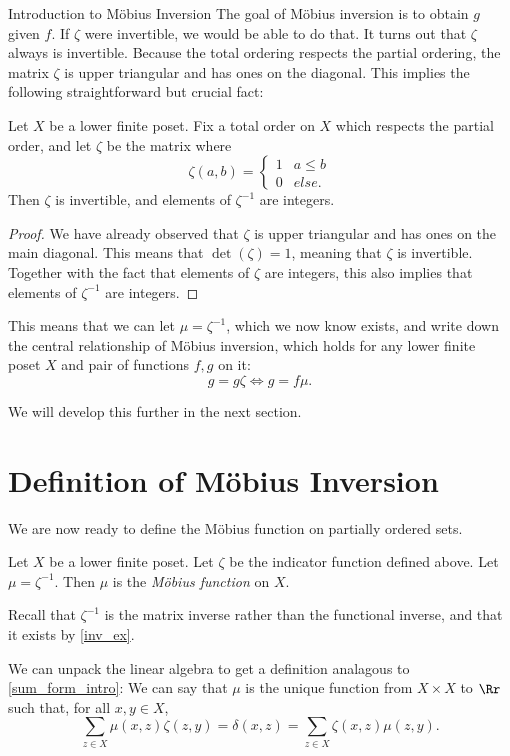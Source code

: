 \documentclass[12pt]{pom_thesis}
\begin{document}
\begin{chapter}{Introduction to M\"obius Inversion}
The goal of M\"obius inversion is to obtain $g$ given $f$. If $\zeta$ were invertible, we would be able to do that. It turns out that $\zeta$ always is invertible. Because the total ordering respects the partial ordering, the matrix $\zeta$ is upper triangular and has ones on the diagonal. This implies the following straightforward but crucial fact:
\begin{lemma}\label{inv_ex}
Let $X$ be a lower finite poset. Fix a total order on $X$ which respects the partial order, and let $\zeta$ be the matrix where 
\[
\zeta(a,b) = \begin{cases}1 & a \leq b \\ 0 & else. \end{cases}
\]
Then $\zeta$ is invertible, and elements of $\zeta^{-1}$ are integers.
\end{lemma}
\begin{proof}
We have already observed that $\zeta$ is upper triangular and has ones on the main diagonal. This means that $\det(\zeta) = 1$, meaning that $\zeta$ is invertible. Together with the fact that elements of $\zeta$ are integers, this also implies that elements of $\zeta^{-1}$ are integers.
\end{proof}

This means that we can let $\mu=\zeta^{-1}$, which we now know exists, and write down the central relationship of M\"obius inversion, which holds for any lower finite poset $X$ and pair of functions $f,g$ on it:
\[
g = g \zeta \iff g = f \mu.
\]

We will develop this further in the next section.

\section{Definition of M\"obius Inversion}
We are now ready to define the M\"obius function on partially ordered sets.
\begin{defn}\label{def_mob_pos}
Let $X$ be a lower finite poset. Let $\zeta$ be the indicator function defined above. Let $\mu = \zeta^{-1}$. Then $\mu$ is the \emph{M\"obius function} on $X$.
\end{defn}
\begin{rmk}
Recall that $\zeta^{-1}$ is the matrix inverse rather than the functional inverse, and that it exists by \ref{inv_ex}.
\end{rmk}
\begin{rmk}\label{sum_form}
We can unpack the linear algebra to get a definition analagous to \ref{sum_form_intro}: We can say that $\mu$ is the unique function from $X\times X$ to $\Rr$ such that, for all $x,y \in X$,
\[
\sum_{z \in X} \mu(x,z)\zeta(z,y) = \delta(x,z) = \sum_{z \in X} \zeta(x,z)\mu(z,y).
\]
\end{rmk}


\end{chapter}
\end{document}
